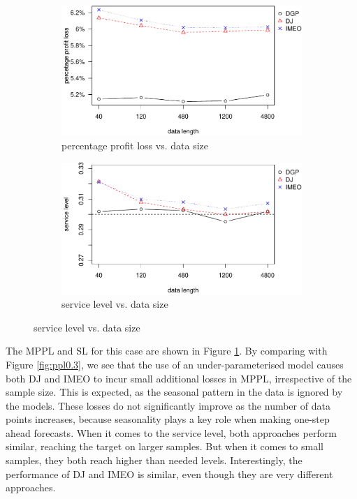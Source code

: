 \documentclass[a4paper,11pt]{article}
\begin{document}
\begin{figure}[ht]
\centering
\caption{Performance vs. sample size with under-parameterised linear model}
\begin{subfigure}[b]{0.48\textwidth}
\centering
\includegraphics[width=\textwidth]{AR(1)ppl.pdf}
\caption{percentage profit loss vs. data size}
\end{subfigure}
\hfill
\begin{subfigure}[b]{0.48\textwidth}
\centering
\includegraphics[width=\textwidth]{AR(1)sl.pdf}
\caption{service level vs. data size}
\end{subfigure}
\label{fig:mis_under}
\end{figure}

The MPPL and SL for this case are shown in Figure \ref{fig:mis_under}. By comparing with Figure \ref{fig:ppl0.3}, we see that the use of an under-parameterised model causes both DJ and IMEO to incur small additional losses in MPPL, irrespective of the sample size. This is expected, as the seasonal pattern in the data is ignored by the models. These losses do not significantly improve as the number of data points increases, because seasonality plays a key role when making one-step ahead forecasts. When it comes to the service level, both approaches perform similar, reaching the target on larger samples. But when it comes to small samples, they both reach higher than needed levels. Interestingly, the performance of DJ and IMEO is similar, even though they are very different approaches.%
\end{document}
